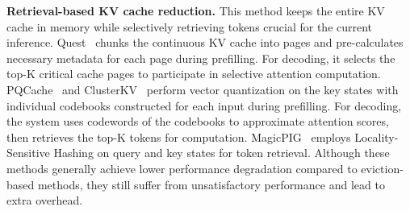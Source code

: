 \noindent\textbf{Retrieval-based KV cache reduction.}
This method keeps the entire KV cache in memory while selectively retrieving tokens crucial for the current inference. 
Quest~\citep{quest} chunks the continuous KV cache into pages and pre-calculates necessary metadata for each page during prefilling. 
For decoding, it selects the top-K critical cache pages to participate in selective attention computation. 
PQCache~\citep{pqcache} and ClusterKV~\citep{clusterkv} perform vector quantization on the key states with individual codebooks constructed for each input during prefilling.
For decoding, the system uses codewords of the codebooks to approximate attention scores, then retrieves the top-K tokens for computation. 
MagicPIG~\citep{magicpig} employs Locality-Sensitive Hashing on query and key states for token retrieval.
Although these methods generally achieve lower performance degradation compared to eviction-based methods, they still suffer from unsatisfactory performance and lead to extra
overhead.